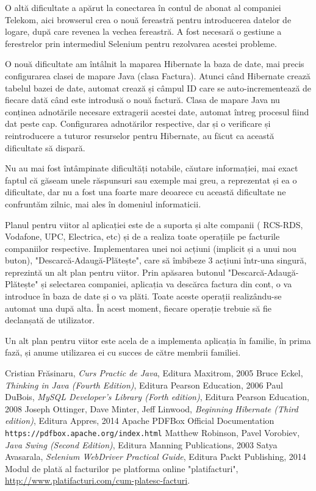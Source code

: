 \documentclass[12pt]{book}
\begin{document}
O altă dificultate a apărut la conectarea în contul de abonat al companiei Telekom, aici browserul crea o nouă fereastră pentru introducerea datelor de logare, după care revenea la vechea fereastră. A fost necesară o gestiune a ferestrelor prin intermediul Selenium pentru rezolvarea acestei probleme.

O nouă dificultate am întâlnit la maparea Hibernate la baza de date, mai precis configurarea clasei de mapare Java (clasa Factura). Atunci când Hibernate crează tabelul bazei de date, automat crează și câmpul ID care se auto-incrementează de fiecare dată când este introdusă o nouă factură. Clasa de mapare Java nu conținea adnotările necesare extragerii acestei date, automat întreg procesul fiind dat peste cap. Configurarea adnotărilor respective, dar și o verificare și reintroducere a tuturor resurselor pentru Hibernate, au făcut ca această dificultate să dispară.

Nu au mai fost întâmpinate dificultăți notabile, căutare informației, mai exact faptul că găseam unele răspunsuri sau exemple mai greu, a reprezentat și ea o dificultate, dar nu a fost una foarte mare deoarece cu această dificultate ne confruntăm zilnic, mai ales în domeniul informaticii.

Planul pentru viitor al aplicației este de a suporta și alte companii ( RCS-RDS, Vodafone, UPC, Electrica, etc) și de a realiza toate operațiile pe facturile companiilor respective. Implementarea unei noi acțiuni (implicit și a unui nou buton), "Descarcă-Adaugă-Plătește", care să îmbibeze 3 acțiuni într-una singură, reprezintă un alt plan pentru viitor. Prin apăsarea butonul "Descarcă-Adaugă-Plătește" și selectarea companiei, aplicația va descărca factura din cont, o va introduce în baza de date și o va plăti. Toate aceste operații realizându-se automat una după alta. În acest moment, fiecare operație trebuie să fie declanșată de utilizator. 

Un alt plan pentru viitor este acela de a implementa aplicația în familie, în prima fază,  și anume utilizarea ei cu succes de către membrii familiei.

\begin{thebibliography}{9}
	  Cristian Frăsinaru, {\em Curs Practic de Java}, Editura Maxitrom, 2005
	  Bruce Eckel, {\em Thinking in Java (Fourth Edition)}, Editura Pearson Education, 2006
	 Paul DuBois, {\em MySQL Developer's Library (Forth edition)}, Editura Pearson Education, 2008
	 Joseph Ottinger, Dave Minter, Jeff Linwood, {\em Beginning Hibernate (Third edition)}, Editura Appres, 2014
	 Apache PDFBox Official Documentation
	\\\texttt{https://pdfbox.apache.org/index.html}
	 Matthew Robinson, Pavel Vorobiev, {\em Java Swing (Second Edition)}, Editura Manning Publications, 2003
	 Satya Avasarala, {\em Selenium WebDriver Practical Guide}, Editura Packt Publishing, 2014
	Modul de plată al facturilor pe platforma online "platifacturi", \url{http://www.platifacturi.com/cum-platesc-facturi}.
\end{thebibliography}
	
\end{document}
